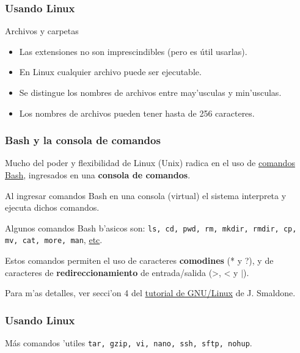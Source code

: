 \documentclass[hyperref={colorlinks}]{beamer}
\begin{document}
\begin{frame}\frametitle{Usando Linux}
\begin{block}{Archivos y carpetas}
\begin{itemize}
\item Las extensiones no son imprescindibles (pero es útil usarlas).
\item En Linux cualquier archivo puede ser ejecutable.
\item Se distingue los nombres de archivos entre may'usculas y min'usculas.
\item Los nombres de archivos pueden tener hasta de 256 caracteres.
\end{itemize}
\end{block}
\end{frame}


\begin{frame}\frametitle{Bash y la consola de comandos}
\begin{block}{}
Mucho del poder y flexibilidad de Linux (Unix) radica en el uso de \href{https://es.wikipedia.org/wiki/Comandos_Bash}{comandos Bash}, ingresados en una \textbf{consola de comandos}.

Al ingresar comandos Bash en una consola (virtual) el sistema interpreta y ejecuta dichos comandos.
\end{block}
\begin{block}{}
Algunos comandos Bash b'asicos son: \texttt{ls, cd, pwd, rm, mkdir, rmdir, cp, mv, cat, more, man}, \href{https://es.wikipedia.org/wiki/Comandos_Bash}{etc}.
\end{block}

\begin{block}{}
Estos comandos permiten el uso de caracteres \textbf{comodines} (* y ?), y de caracteres de \textbf{redireccionamiento} de entrada/salida (>, < y $|$).
\end{block}

\begin{block}{}
Para m'as detalles, ver secci'on 4 del \href{http://www.smaldone.com.ar/documentos/misdocumentos.shtml}{tutorial de GNU/Linux} de J. Smaldone.
\end{block}
\end{frame}

\begin{frame}\frametitle{Usando Linux}
\begin{block}{M\'as comandos 'utiles}
\texttt{tar, gzip, vi, nano, ssh, sftp, nohup}.
\end{block}
\end{frame}
\end{document}
